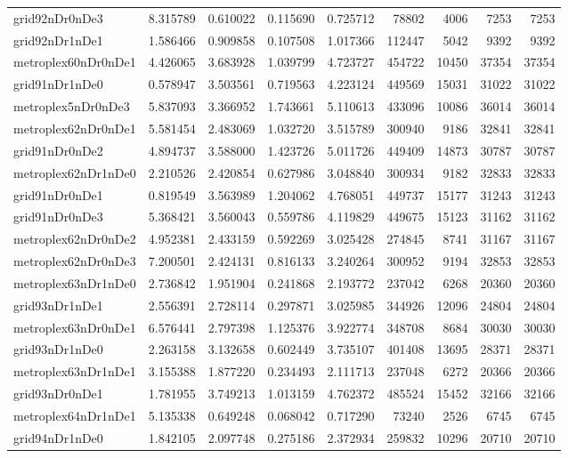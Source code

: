\begin{longtable}{|l|r|r|r|r|r|r|r|r|}
grid92nDr0nDe3 & 8.315789 & 0.610022 & 0.115690 & 0.725712 & 78802 & 4006 & 7253 & 7253 \\
grid92nDr1nDe1 & 1.586466 & 0.909858 & 0.107508 & 1.017366 & 112447 & 5042 & 9392 & 9392 \\
metroplex60nDr0nDe1 & 4.426065 & 3.683928 & 1.039799 & 4.723727 & 454722 & 10450 & 37354 & 37354 \\
grid91nDr1nDe0 & 0.578947 & 3.503561 & 0.719563 & 4.223124 & 449569 & 15031 & 31022 & 31022 \\
metroplex5nDr0nDe3 & 5.837093 & 3.366952 & 1.743661 & 5.110613 & 433096 & 10086 & 36014 & 36014 \\
metroplex62nDr0nDe1 & 5.581454 & 2.483069 & 1.032720 & 3.515789 & 300940 & 9186 & 32841 & 32841 \\
grid91nDr0nDe2 & 4.894737 & 3.588000 & 1.423726 & 5.011726 & 449409 & 14873 & 30787 & 30787 \\
metroplex62nDr1nDe0 & 2.210526 & 2.420854 & 0.627986 & 3.048840 & 300934 & 9182 & 32833 & 32833 \\
grid91nDr0nDe1 & 0.819549 & 3.563989 & 1.204062 & 4.768051 & 449737 & 15177 & 31243 & 31243 \\
grid91nDr0nDe3 & 5.368421 & 3.560043 & 0.559786 & 4.119829 & 449675 & 15123 & 31162 & 31162 \\
metroplex62nDr0nDe2 & 4.952381 & 2.433159 & 0.592269 & 3.025428 & 274845 & 8741 & 31167 & 31167 \\
metroplex62nDr0nDe3 & 7.200501 & 2.424131 & 0.816133 & 3.240264 & 300952 & 9194 & 32853 & 32853 \\
metroplex63nDr1nDe0 & 2.736842 & 1.951904 & 0.241868 & 2.193772 & 237042 & 6268 & 20360 & 20360 \\
grid93nDr1nDe1 & 2.556391 & 2.728114 & 0.297871 & 3.025985 & 344926 & 12096 & 24804 & 24804 \\
metroplex63nDr0nDe1 & 6.576441 & 2.797398 & 1.125376 & 3.922774 & 348708 & 8684 & 30030 & 30030 \\
grid93nDr1nDe0 & 2.263158 & 3.132658 & 0.602449 & 3.735107 & 401408 & 13695 & 28371 & 28371 \\
metroplex63nDr1nDe1 & 3.155388 & 1.877220 & 0.234493 & 2.111713 & 237048 & 6272 & 20366 & 20366 \\
grid93nDr0nDe1 & 1.781955 & 3.749213 & 1.013159 & 4.762372 & 485524 & 15452 & 32166 & 32166 \\
metroplex64nDr1nDe1 & 5.135338 & 0.649248 & 0.068042 & 0.717290 & 73240 & 2526 & 6745 & 6745 \\
grid94nDr1nDe0 & 1.842105 & 2.097748 & 0.275186 & 2.372934 & 259832 & 10296 & 20710 & 20710 \\

\end{longtable}
